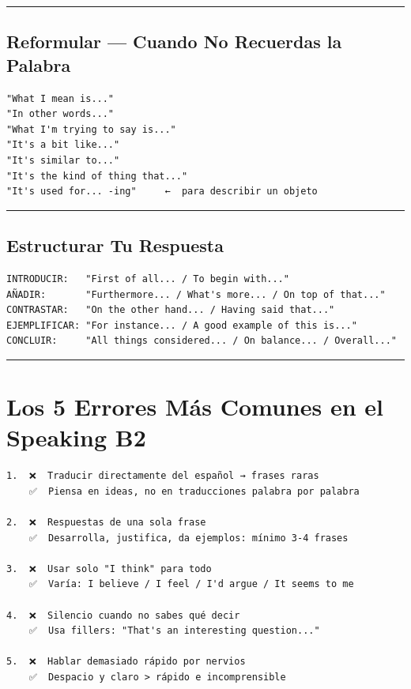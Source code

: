 \documentclass[
  spanish,
  letterpaper,
]{scrbook}
\begin{document}
\begin{center}\rule{0.5\linewidth}{0.5pt}\end{center}

\subsection{Reformular --- Cuando No Recuerdas la
Palabra}\label{reformular-cuando-no-recuerdas-la-palabra}

\begin{verbatim}
"What I mean is..."
"In other words..."
"What I'm trying to say is..."
"It's a bit like..."
"It's similar to..."
"It's the kind of thing that..."
"It's used for... -ing"     ←  para describir un objeto
\end{verbatim}

\begin{center}\rule{0.5\linewidth}{0.5pt}\end{center}

\subsection{Estructurar Tu Respuesta}\label{estructurar-tu-respuesta}

\begin{verbatim}
INTRODUCIR:   "First of all... / To begin with..."
AÑADIR:       "Furthermore... / What's more... / On top of that..."
CONTRASTAR:   "On the other hand... / Having said that..."
EJEMPLIFICAR: "For instance... / A good example of this is..."
CONCLUIR:     "All things considered... / On balance... / Overall..."
\end{verbatim}

\begin{center}\rule{0.5\linewidth}{0.5pt}\end{center}

\section{Los 5 Errores Más Comunes en el Speaking
B2}\label{los-5-errores-muxe1s-comunes-en-el-speaking-b2}

\begin{verbatim}
1.  ❌  Traducir directamente del español → frases raras
    ✅  Piensa en ideas, no en traducciones palabra por palabra

2.  ❌  Respuestas de una sola frase
    ✅  Desarrolla, justifica, da ejemplos: mínimo 3-4 frases

3.  ❌  Usar solo "I think" para todo
    ✅  Varía: I believe / I feel / I'd argue / It seems to me

4.  ❌  Silencio cuando no sabes qué decir
    ✅  Usa fillers: "That's an interesting question..."

5.  ❌  Hablar demasiado rápido por nervios
    ✅  Despacio y claro > rápido e incomprensible
\end{verbatim}
\end{document}
